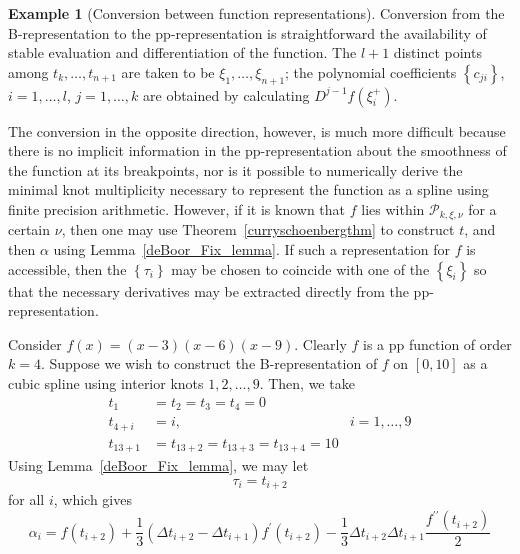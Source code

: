 \documentclass[12pt]{article}
\newcommand{\PP}{\mathcal{P}}
\theoremstyle{definition}
\newtheorem{example}{Example}[section]
\begin{document}
\begin{example}[Conversion between function representations] 

Conversion from the B-representation to the pp-representation is straightforward the availability of stable evaluation and differentiation of the function. The $l+1$ distinct points among $t_k,\dots,t_{n+1}$ are taken to be $\xi_1, \dots, \xi_{n+1}$; the polynomial coefficients $\left \{ c_{ji} \right\}$, $i=1,\dots,l$, $j=1,\dots,k$ are obtained by calculating $D^{j-1}f\left(\xi_i^+\right)$.

The conversion in the opposite direction, however, is much more difficult because there is no implicit information in the pp-representation about the smoothness of the function at its breakpoints, nor is it possible to numerically derive the minimal knot multiplicity necessary to represent the function as a spline using finite precision arithmetic. However, if it is known that $f$ lies within $\PP_{k,\xi,\nu}$ for a certain $\nu$, then one may use Theorem~\ref{curryschoenbergthm} to construct $t$, and then $\alpha$ using Lemma~\ref{deBoor_Fix_lemma}. If such a representation for $f$ is accessible, then the $\left\{ \tau_i \right\}$ may be chosen to coincide with one of the $\left\{ \xi_i \right\}$ so that the necessary derivatives may be extracted directly from the pp-representation.

Consider $f\left(x \right) = \left(x-3\right)\left(x-6\right)\left(x-9\right)$. Clearly $f$ is a pp function of order $k=4$. Suppose we wish to construct the B-representation of $f$ on $\left[0,10\right]$ as a cubic spline using interior knots $1,2,\dots,9$. Then, we take
\begin{align*}
t_1 &= t_2 = t_3 = t_4 = 0 & \\
t_{4+i} &= i, & i=1,\dots,9\\
t_{13+1} &= t_{13+2} = t_{13+3} = t_{13+4} = 10 & 
\end{align*}
Using Lemma~\ref{deBoor_Fix_lemma}, we may let 
\[
\tau_i = t_{i+2}
\]
for all $i$, which gives 
\[
\alpha_i = f\left( t_{i+2} \right) + \frac{1}{3}\left( \Delta t_{i+2} - \Delta t_{i+1} \right)f^\prime \left(t_{i+2}\right) - \frac{1}{3}\Delta t_{i+2} \Delta t_{i+1} \frac{f^{\prime \prime}\left(t_{i+2}\right)}{2}
\]

\end{example}

\end{document}
